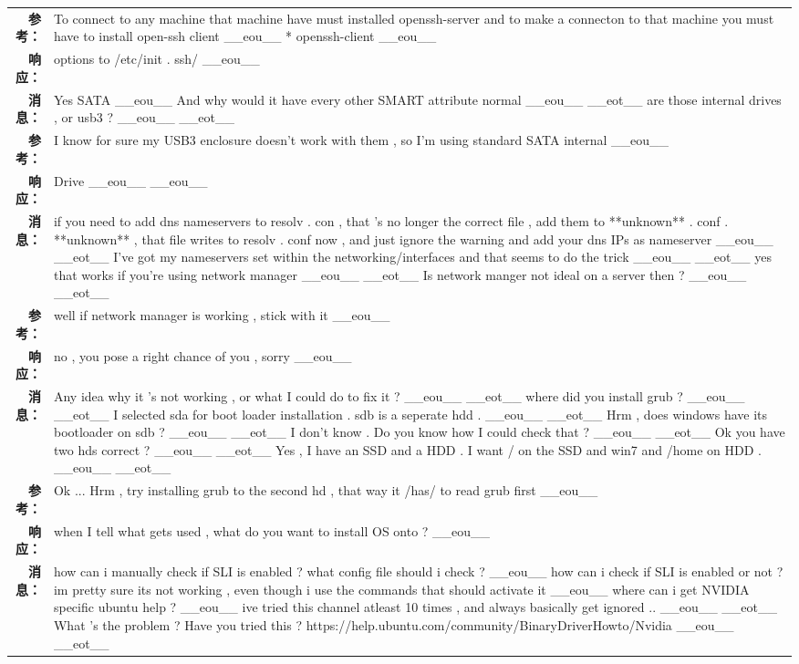 \begin{tabularx}{\textwidth}{@{}rX@{}}
\textbf{参考：}&To connect to any machine that machine have must installed openssh{-}server and to make a connecton to that machine you must have to install open{-}ssh client \_\_eou\_\_ * openssh{-}client \_\_eou\_\_\\%
\textbf{响应：}&options to /etc/init . ssh/ \_\_eou\_\_\\%
\midrule%
\textbf{消息：}&Yes SATA \_\_eou\_\_ And why would it have every other SMART attribute normal \_\_eou\_\_ \_\_eot\_\_ are those internal drives , or usb3 ? \_\_eou\_\_ \_\_eot\_\_\\%
\textbf{参考：}&I know for sure my USB3 enclosure doesn't work with them , so I'm using standard SATA internal \_\_eou\_\_\\%
\textbf{响应：}&Drive \_\_eou\_\_ \_\_eou\_\_\\%
\midrule%
\textbf{消息：}&if you need to add dns nameservers to resolv . con , that 's no longer the correct file , add them to **unknown** . conf . **unknown** , that file writes to resolv . conf now , and just ignore the warning and add your dns IPs as nameserver \_\_eou\_\_ \_\_eot\_\_ I've got my nameservers set within the networking/interfaces and that seems to do the trick \_\_eou\_\_ \_\_eot\_\_ yes that works if you're using network manager \_\_eou\_\_ \_\_eot\_\_ Is network manger not ideal on a server then ? \_\_eou\_\_ \_\_eot\_\_\\%
\textbf{参考：}&well if network manager is working , stick with it \_\_eou\_\_\\%
\textbf{响应：}&no , you pose a right chance of you , sorry \_\_eou\_\_\\%
\midrule%
\textbf{消息：}&Any idea why it 's not working , or what I could do to fix it ? \_\_eou\_\_ \_\_eot\_\_ where did you install grub ? \_\_eou\_\_ \_\_eot\_\_ I selected sda for boot loader installation . sdb is a seperate hdd . \_\_eou\_\_ \_\_eot\_\_ Hrm , does windows have its bootloader on sdb ? \_\_eou\_\_ \_\_eot\_\_ I don't know . Do you know how I could check that ? \_\_eou\_\_ \_\_eot\_\_ Ok you have two hds correct ? \_\_eou\_\_ \_\_eot\_\_ Yes , I have an SSD and a HDD . I want / on the SSD and win7 and /home on HDD . \_\_eou\_\_ \_\_eot\_\_\\%
\textbf{参考：}&Ok ... Hrm , try installing grub to the second hd , that way it /has/ to read grub first \_\_eou\_\_\\%
\textbf{响应：}&when I tell what gets used , what do you want to install OS onto ? \_\_eou\_\_\\%
\midrule%
\textbf{消息：}&how can i manually check if SLI is enabled ? what config file should i check ? \_\_eou\_\_ how can i check if SLI is enabled or not ? im pretty sure its not working , even though i use the commands that should activate it \_\_eou\_\_ where can i get NVIDIA specific ubuntu help ? \_\_eou\_\_ ive tried this channel atleast 10 times , and always basically get ignored .. \_\_eou\_\_ \_\_eot\_\_ What 's the problem ? Have you tried this ? https://help.ubuntu.com/community/BinaryDriverHowto/Nvidia \_\_eou\_\_ \_\_eot\_\_\\%

\end{tabularx}
